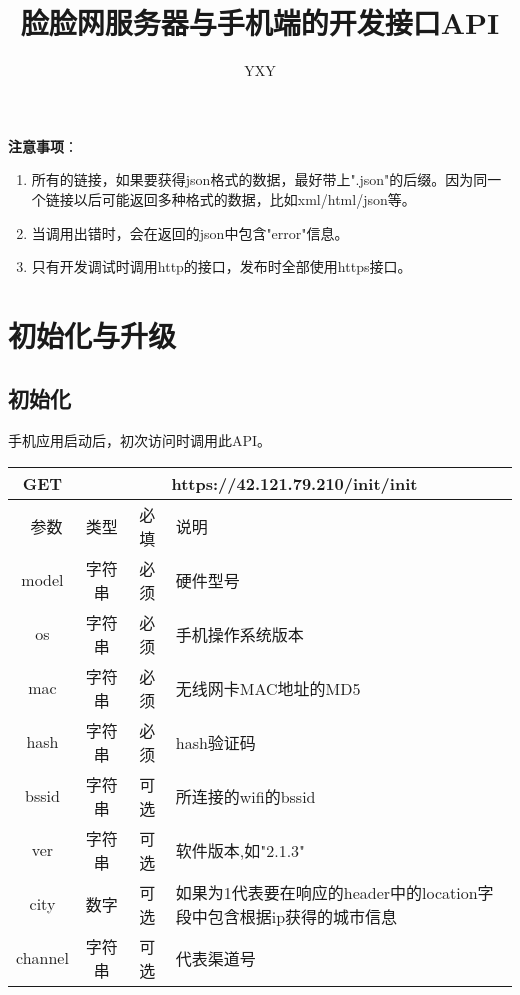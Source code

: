 \documentclass[cs4size]{ctexartutf8}
\author{YXY}
\title{脸脸网服务器与手机端的开发接口API}
\begin{document}
 
\maketitle
\tableofcontents

\newpage

\textbf{注意事项}：
\begin{enumerate}
\item 所有的链接，如果要获得json格式的数据，最好带上".json"的后缀。因为同一个链接以后可能返回多种格式的数据，比如xml/html/json等。
\item 当调用出错时，会在返回的json中包含"error"信息。
\item 只有开发调试时调用http的接口，发布时全部使用https接口。
\end{enumerate}

\newpage

\section{初始化与升级}
\subsection{初始化}

手机应用启动后，初次访问时调用此API。
\begin{table}[H]
   \begin{center}
\begin{tabular}{|c|c|c|p{12cm}|}
\hline
GET & \multicolumn{3}{|c|}{https://42.121.79.210/init/init} \\
\hline\hline
 \  参数  & 类型 & 必填 &  说明  \\
 \hline
 model  & 字符串 & 必须 &  硬件型号\\
\hline
 os  & 字符串 & 必须 &  手机操作系统版本\\
 \hline
 mac  & 字符串 & 必须 &  无线网卡MAC地址的MD5\\
 \hline
 hash  & 字符串 & 必须 &  hash验证码\\
 \hline
 bssid  & 字符串 & 可选 &  所连接的wifi的bssid\\ 
  \hline
 ver  & 字符串 & 可选 &  软件版本,如"2.1.3"\\
  \hline
 city  & 数字 & 可选 &  如果为1代表要在响应的header中的location字段中包含根据ip获得的城市信息\\ 
\hline
 channel  & 字符串 & 可选 &  代表渠道号\\
\hline
\end{tabular}
   \end{center}
\end{table}
\end{document}

